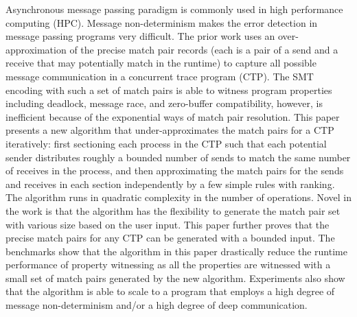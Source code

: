 Asynchronous message passing paradigm is commonly used in high performance computing (HPC).
Message non-determinism makes the error detection in message passing programs very difficult. The prior work uses an over-approximation of the precise match pair records (each is a pair of a send and a receive that may potentially match in the runtime) to capture all possible message communication in a concurrent trace program (CTP). The SMT encoding with such a set of match pairs is able to witness program properties including deadlock, message race, and zero-buffer compatibility, however, is inefficient because of the exponential ways of match pair resolution.
This paper presents a new algorithm that under-approximates the match pairs for a CTP iteratively: first sectioning each process in the CTP such that each potential sender distributes roughly a bounded number of sends to match the same number of receives in the process, and then approximating the match pairs for the sends and receives in each section independently by a few simple rules with ranking. The algorithm runs in quadratic complexity in the number of operations. Novel in the work is that the algorithm has the flexibility to generate the match pair set with various size based on the user input. This paper further proves that the precise match pairs for any CTP can be generated with a bounded input. The benchmarks show that the algorithm in this paper drastically reduce the runtime performance of property witnessing as all the properties are witnessed with a small set of match pairs generated by the new algorithm. Experiments also show that the algorithm is able to scale to a program that employs a high degree of message non-determinism and/or a high degree of deep communication.